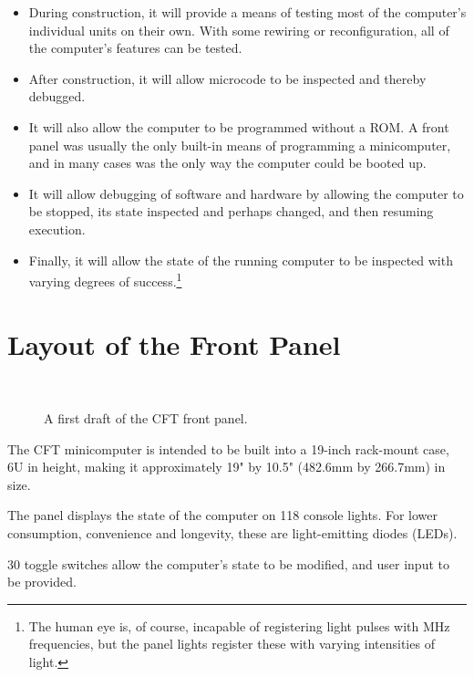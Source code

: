 \begin{itemize}
\item During construction, it will provide a means of testing most of
  the computer's individual units on their own. With some rewiring or
  reconfiguration, all of the computer's features can be tested.

\item After construction, it will allow microcode to be inspected and
  thereby debugged.

\item It will also allow the computer to be programmed without a
  ROM. A front panel was usually the only built-in means of
  programming a minicomputer, and in many cases was the only way the
  computer could be booted up.

\item It will allow debugging of software and hardware by allowing the
  computer to be stopped, its state inspected and perhaps changed, and
  then resuming execution.

\item Finally, it will allow the state of the running computer to be
  inspected with varying degrees of success.\footnote{The human eye
    is, of course, incapable of registering light pulses with MHz
    frequencies, but the panel lights register these with varying
    intensities of light.}

\end{itemize}

\section{Layout of the Front Panel}

\begin{figure}[t]
\centering
{}\\
\caption{\label{fig-panel}A first draft of the CFT front panel.}
\end{figure}

The CFT minicomputer is intended to be built into a 19-inch rack-mount case, 6U
in height, making it approximately 19" by 10.5" (482.6mm by 266.7mm) in size.

The panel displays the state of the computer on 118 console lights. For lower
consumption, convenience and longevity, these are light-emitting diodes (LEDs).

30 toggle switches allow the computer's state to be modified, and user input to
be provided.


